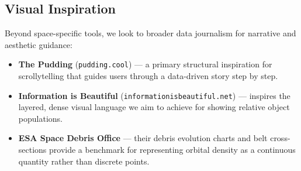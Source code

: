 \subsection{Visual Inspiration}
Beyond space-specific tools, we look to broader data journalism for narrative and aesthetic guidance:
\begin{itemize}
    \item \textbf{The Pudding} (\texttt{pudding.cool}) — a primary structural inspiration for scrollytelling that guides users through a data-driven story step by step.
    \item \textbf{Information is Beautiful} (\texttt{informationisbeautiful.net}) — inspires the layered, dense visual language we aim to achieve for showing relative object populations.
    \item \textbf{ESA Space Debris Office} — their debris evolution charts and belt cross-sections provide a benchmark for representing orbital density as a continuous quantity rather than discrete points.
\end{itemize}
